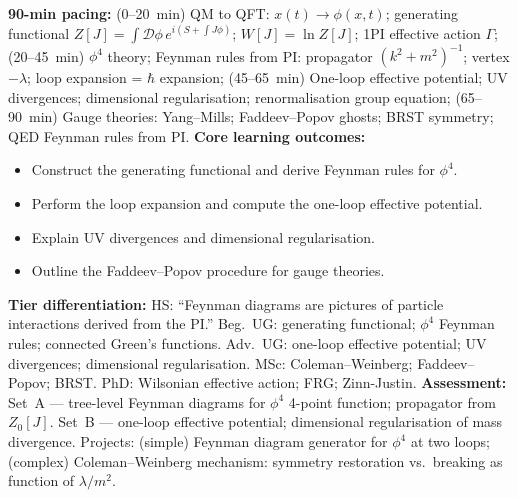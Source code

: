\documentclass[11pt,a4paper]{article}
\begin{document}
\begin{tcolorbox}[modulebox, title={Module~II.2 --- Lecture L09: Path Integrals in Field Theory}]
\textbf{90-min pacing:} (0--20~min) QM to QFT: $x(t)\to\phi(x,t)$; generating functional $Z[J]=\int\mathcal{D}\phi\,e^{i(S+\int J\phi)}$; $W[J]=\ln Z[J]$; 1PI effective action $\Gamma$; (20--45~min) $\phi^4$ theory; Feynman rules from PI: propagator $(k^2+m^2)^{-1}$; vertex $-\lambda$; loop expansion = $\hbar$ expansion; (45--65~min) One-loop effective potential; UV divergences; dimensional regularisation; renormalisation group equation; (65--90~min) Gauge theories: Yang--Mills; Faddeev--Popov ghosts; BRST symmetry; QED Feynman rules from PI.
\medskip\textbf{Core learning outcomes:}
\begin{itemize}[leftmargin=1.4em,topsep=2pt,itemsep=1pt]
  \item Construct the generating functional and derive Feynman rules for $\phi^4$.
  \item Perform the loop expansion and compute the one-loop effective potential.
  \item Explain UV divergences and dimensional regularisation.
  \item Outline the Faddeev--Popov procedure for gauge theories.
\end{itemize}
\medskip\textbf{Tier differentiation:}
HS: ``Feynman diagrams are pictures of particle interactions derived from the PI.''
Beg.\ UG: generating functional; $\phi^4$ Feynman rules; connected Green's functions.
Adv.\ UG: one-loop effective potential; UV divergences; dimensional regularisation.
MSc: Coleman--Weinberg; Faddeev--Popov; BRST.
PhD: Wilsonian effective action; FRG; Zinn-Justin.
\medskip\textbf{Assessment:}
Set~A --- tree-level Feynman diagrams for $\phi^4$ 4-point function; propagator from $Z_0[J]$.
Set~B --- one-loop effective potential; dimensional regularisation of mass divergence.
Projects: (simple) Feynman diagram generator for $\phi^4$ at two loops; (complex) Coleman--Weinberg mechanism: symmetry restoration vs.\ breaking as function of $\lambda/m^2$.
\end{tcolorbox}

\medskip
\end{document}
